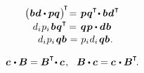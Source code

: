 \nopagebreak\vspace{-0.2em}
\begin{equation*}
\begin{array}{r@{\hspace{.8ex}}c@{\hspace{.8ex}}l}
\bigl(\hspace{.1ex} \bm{b} \hspace{.1ex} \bm{d} \dotp \bm{p} \bm{q} \hspace{.1ex}\bigr)^{\hspace{-0.25ex}\T} \hspace{-0.4ex} & \hspace{-0.4ex} = & \hspace{-0.1ex} \bm{p} \hspace{.1ex} \bm{q}^{\T} \hspace{-0.4ex} \dotp \bm{b} \hspace{.1ex} \bm{d}^{\hspace{.1ex}\T}
\\[.2em]
d_i  \hspace{.1ex} p_i \hspace{.25ex} \bm{b} \hspace{.1ex} \bm{q}^{\T} & \hspace{-0.5ex} = & \hspace{-0.1ex} \bm{q} \hspace{.1ex} \bm{p} \dotp \bm{d}  \hspace{.1ex} \bm{b}
\\[.1em]
d_i  \hspace{.1ex} p_i \hspace{.25ex} \bm{q} \bm{b} & = & p_i  \hspace{.1ex} d_i \hspace{.25ex} \bm{q} \bm{b}
\hspace{.1ex} .
\end{array}
\end{equation*}

\noindent
{}

\nopagebreak\vspace{-0.2em}
\begin{equation}%
\bm{c} \hspace{.2ex} \dotp \bm{B}
= \bm{B}^{\T} \hspace{-0.4ex} \dotp \bm{c}
\hspace{.2ex} , \hspace{.7em}
%
\bm{B} \dotp \bm{c}
= \bm{c} \hspace{.2ex} \dotp \bm{B}^{\T}
\hspace{-0.3ex} .
\end{equation}

